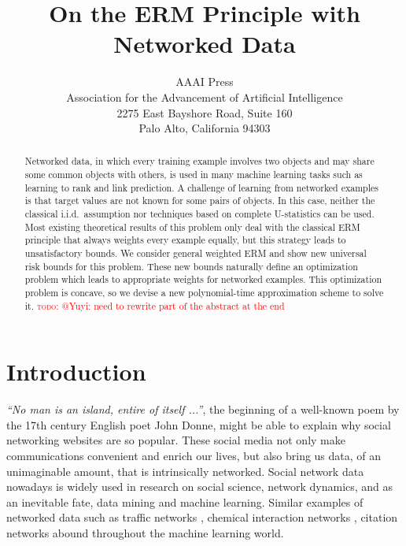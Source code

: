 \documentclass[letterpaper]{article} %
\newcommand{\red}[1]{\textcolor{red}{#1}}
\newcommand{\todo}[1]{\red{\textsc{todo:} #1}}
\begin{document}
\title{On the ERM Principle with Networked Data}

\author{AAAI Press\\
Association for the Advancement of Artificial Intelligence\\
2275 East Bayshore Road, Suite 160\\
Palo Alto, California 94303\\
}
\maketitle

\begin{abstract}
Networked data, in which every training example involves two objects and may share some common objects with others, is used in many machine learning tasks such as learning to rank and link prediction. 
A challenge of learning from networked examples is that target values are not known for some pairs of objects. 
In this case, neither the classical i.i.d.\ assumption nor techniques based on complete U-statistics can be used. 
Most existing theoretical results of this problem only deal with the classical ERM principle that always weights every example equally, 
but this strategy leads to unsatisfactory bounds. 
We consider general weighted ERM and show new universal risk bounds for this problem. 
These new bounds naturally define an optimization problem which leads to appropriate weights for networked examples. 
This optimization problem is concave, so we devise a new polynomial-time approximation scheme to solve it. \todo{@Yuyi: need to rewrite part of the abstract at the end}
\end{abstract}

\section{Introduction}
\label{sec:introduction}
\textit{``No man is an island, entire of itself ...''}, the beginning of a well-known poem by the 17th century English poet John Donne, might be able to explain why social networking websites are so popular. 
These social media not only make communications convenient and enrich our lives, but also bring us data, of an unimaginable amount, that is intrinsically networked. 
Social network data nowadays is widely used in research on social science, network dynamics, and as an inevitable fate, data mining and machine learning. 
Similar examples of networked data such as traffic networks \cite{min2011real}, chemical interaction networks \cite{szklarczyk2014string}, citation networks \cite{dawson2014current} abound throughout the machine learning world. 
\end{document}
